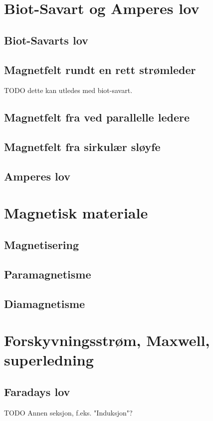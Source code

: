 \documentclass{article}
\begin{document}
  \section{Biot-Savart og Amperes lov}
    \subsection{Biot-Savarts lov}
      
    \subsection{Magnetfelt rundt en rett strømleder}
      
      TODO dette kan utledes med biot-savart.
    \subsection{Magnetfelt fra ved parallelle ledere}
      
    \subsection{Magnetfelt fra sirkulær sløyfe}
      
    \subsection{Amperes lov}
      
  \section{Magnetisk materiale}
    \subsection{Magnetisering}
      
    \subsection{Paramagnetisme}
      
    \subsection{Diamagnetisme}
      
  \section{Forskyvningsstrøm, Maxwell, superledning}
    \subsection{Faradays lov}
      
      TODO Annen seksjon, f.eks. "Induksjon"?
\end{document}
